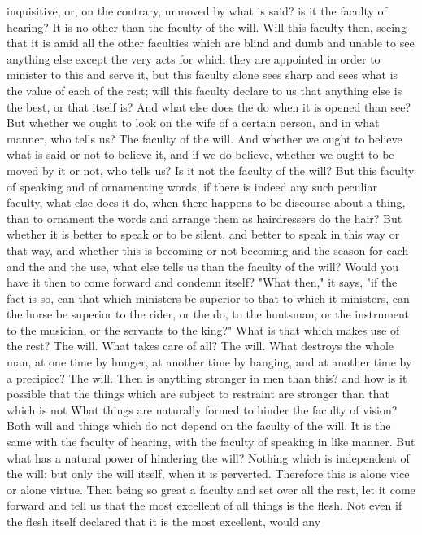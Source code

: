 \documentclass[a4paper]{article}
\begin{document}
inquisitive, or, on the contrary, unmoved by what is said? is it the faculty of
hearing? It is no other than the faculty of the will. Will this faculty then,
seeing that it is amid all the other faculties which are blind and dumb and
unable to see anything else except the very acts for which they are appointed
in order to minister to this and serve it, but this faculty alone sees sharp
and sees what is the value of each of the rest; will this faculty declare to us
that anything else is the best, or that itself is? And what else does the do
when it is opened than see? But whether we ought to look on the wife of a
certain person, and in what manner, who tells us? The faculty of the will. And
whether we ought to believe what is said or not to believe it, and if we do
believe, whether we ought to be moved by it or not, who tells us? Is it not the
faculty of the will? But this faculty of speaking and of ornamenting words, if
there is indeed any such peculiar faculty, what else does it do, when there
happens to be discourse about a thing, than to ornament the words and arrange
them as hairdressers do the hair? But whether it is better to speak or to be
silent, and better to speak in this way or that way, and whether this is
becoming or not becoming and the season for each and the and the use, what else
tells us than the faculty of the will? Would you have it then to come forward
and condemn itself?
    "What then," it says, "if the fact is so, can that which ministers be
superior to that to which it ministers, can the horse be superior to the rider,
or the do, to the huntsman, or the instrument to the musician, or the servants
to the king?" What is that which makes use of the rest? The will. What takes
care of all? The will. What destroys the whole man, at one time by hunger, at
another time by hanging, and at another time by a precipice? The will. Then is
anything stronger in men than this? and how is it possible that the things
which are subject to restraint are stronger than that which is not What things
are naturally formed to hinder the faculty of vision? Both will and things
which do not depend on the faculty of the will. It is the same with the faculty
of hearing, with the faculty of speaking in like manner. But what has a natural
power of hindering the will? Nothing which is independent of the will; but only
the will itself, when it is perverted. Therefore this is alone vice or alone
virtue.
    Then being so great a faculty and set over all the rest, let it come
forward and tell us that the most excellent of all things is the flesh. Not
even if the flesh itself declared that it is the most excellent, would any
\end{document}
